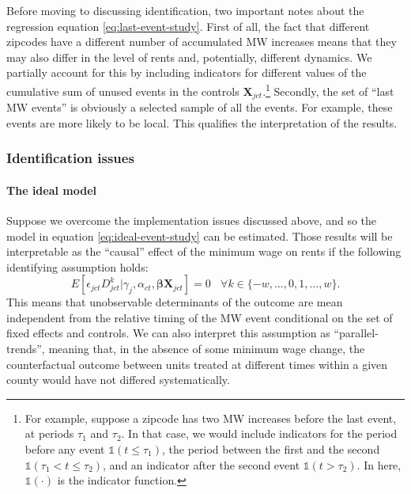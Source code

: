     Before moving to discussing identification, two important notes about the regression equation \eqref{eq:last-event-study}. First of all, the fact that different zipcodes have a different number of accumulated MW increases means that they may also differ in the level of rents and, potentially, different dynamics. We partially account for this by including indicators for different values of the cumulative sum of unused events in the controls $\boldsymbol{X}_{jct}$.\footnote{For example, suppose a zipcode has two MW increases before the last event, at periods $\tau_1$ and $\tau_2$. In that case, we would include indicators for the period before any event $\mathds{1}\left(t \leq \tau_1\right)$, the period between the first and the second $\mathds{1}\left(\tau_1 <  t \leq \tau_2 \right)$, and an indicator after the second event $\mathds{1}\left(t > \tau_2\right)$. In here, $\mathds{1} \left( \cdot \right)$ is the indicator function.} Secondly, the set of ``last MW events'' is obviously a selected sample of all the events. For example, these events are more likely to be local. This qualifies the interpretation of the results.

\subsubsection{Identification issues}
    
    \paragraph{The ideal model}
    
    Suppose we overcome the implementation issues discussed above, and so the model in equation \eqref{eq:ideal-event-study} can be estimated. Those results will be interpretable as the ``causal'' effect of the minimum wage on rents if the following identifying assumption holds: $$E \left[ \epsilon_{jct} D_{jct}^k \big| \gamma_j, \alpha_{ct}, \boldsymbol{\beta} \boldsymbol{X}_{jct}\right]  = 0 \ \ \ \ \forall k\in\{-w, ..., 0, 1, ..., w\}. $$ This means that unobservable determinants of the outcome are mean independent from the relative timing of the MW event conditional on the set of fixed effects and controls. We can also interpret this assumption as ``parallel-trends'', meaning that, in the absence of some minimum wage change, the counterfactual outcome between units treated at different times within a given county would have not differed systematically.
    
